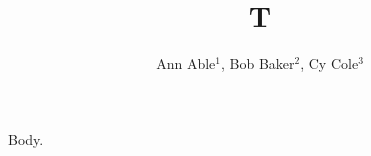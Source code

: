 \documentclass[doc]{apa6}
\title{T}
\author{Ann Able$^{1}$, Bob Baker$^{2}$, Cy Cole$^{3}$}
\affiliation{$^{1}$Univ A, Town, $^{2}$Univ B, City, $^{3}$Univ C, Ville}
\begin{document}
\maketitle
Body.
\end{document}
